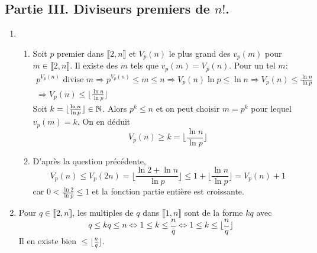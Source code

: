 \subsection*{Partie III. Diviseurs premiers de $n!$.}
\begin{enumerate}
  \item  
\begin{enumerate}
\item Soit $p$ premier dans $\llbracket 2,n\rrbracket$ et $V_p(n)$ le plus grand des $v_p(m)$ pour $m\in \llbracket 2,n \rrbracket$.\newline
Il existe des $m$ tels que $v_p(m) = V_p(n)$. Pour un tel $m$:
\begin{multline*}
  p^{V_p(n)} \text{ divise } m \Rightarrow p^{V_p(n)}\leq m \leq n 
  \Rightarrow V_p(n)\ln p \leq \ln n 
  \Rightarrow V_p(n) \leq \frac{\ln n}{\ln p}\\ 
  \Rightarrow V_p(n) \leq \lfloor \frac{\ln n}{\ln p} \rfloor
\end{multline*}
Soit $k = \lfloor \frac{\ln n}{\ln p} \rfloor \in \mathbb{N}$. Alors $p^k \leq n$ et on peut choisir $m=p^k$ pour lequel $v_{p}(m)=k$. On en déduit
\begin{displaymath}
  V_p(n)\geq k = \lfloor \frac{\ln n}{\ln p} \rfloor
\end{displaymath}

\item D'après la question précédente,
\begin{displaymath}
V_p(n) \leq V_p(2n) = \lfloor \frac{\ln 2 + \ln n}{\ln p} \rfloor 
\leq  1+ \lfloor \frac{\ln n}{\ln p} \rfloor = V_p(n) + 1
\end{displaymath}
car $0 < \frac{\ln 2}{\ln p} \leq 1$ et la fonction partie entière est croissante. 
\end{enumerate}

  \item Pour $q \in \llbracket 2, n\rrbracket$, les multiples de $q$ dans $\llbracket 1,n \rrbracket$ sont de la forme $kq$ avec 
\begin{displaymath}
  q\leq kq \leq n \Leftrightarrow 1\leq k \leq \frac{n}{q} \Leftrightarrow 1\leq k \leq \lfloor \frac{n}{q} \rfloor
\end{displaymath}
Il en existe bien $\leq \lfloor \frac{n}{q} \rfloor$.
  

\end{enumerate}
